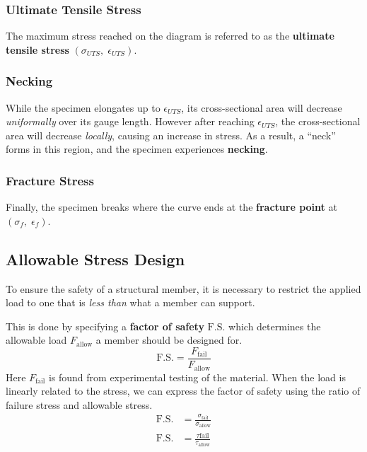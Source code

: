 \documentclass{article}
\begin{document}
\subsubsection{Ultimate Tensile Stress}
The maximum stress reached on the diagram is referred to as the \textbf{ultimate tensile stress} \(\left( \sigma_{UTS},\; \epsilon_{UTS} \right)\).
\subsubsection{Necking}
While the specimen elongates up to \(\epsilon_{UTS}\), its cross-sectional area will decrease \textit{uniformally} over its gauge length.
However after reaching \(\epsilon_{UTS}\), the cross-sectional area will decrease \textit{locally}, causing an increase in stress.
As a result, a ``neck'' forms in this region, and the specimen experiences \textbf{necking}.
\subsubsection{Fracture Stress}
Finally, the specimen breaks where the curve ends at the \textbf{fracture point} at \(\left( \sigma_f,\; \epsilon_f \right)\).
\subsection{Allowable Stress Design}
To ensure the safety of a structural member, it is necessary to restrict the applied load
to one that is \textit{less than} what a member can support.

This is done by specifying a \textbf{factor of safety} \(\mathrm{F.S.}\) which
determines the allowable load \(F_{\mathrm{allow}}\) a member should be designed for.
\begin{equation*}
    \mathrm{F.S.} = \frac{F_{\mathrm{fail}}}{F_{\mathrm{allow}}}
\end{equation*}
Here \(F_{\mathrm{fail}}\) is found from experimental testing of the material. When the load is linearly
related to the stress, we can express the factor of safety using the ratio of failure stress and
allowable stress.
\begin{align*}
    \mathrm{F.S.} & = \frac{\sigma_{\mathrm{fail}}}{\sigma_{\mathrm{allow}}} \\
    \mathrm{F.S.} & = \frac{\tau{\mathrm{fail}}}{\tau_{\mathrm{allow}}}
\end{align*}
\end{document}

